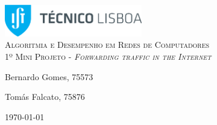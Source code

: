 \begin{titlepage}

	\begin{center}

		\includegraphics[width=6cm]{./title}\\[3cm]

		\textsc{\LARGE Algoritmia e Desempenho em Redes de Computadores}\\[1.5cm]

		\textsc{\Large 1º Mini Projeto - \textit{Forwarding traffic in the Internet}}\\[1.5cm]


		


		\noindent
		\begin{minipage}{0.4\textwidth}
			\begin{flushleft} \large
				Bernardo Gomes, 75573
			\end{flushleft}
		\end{minipage}
		\begin{minipage}{0.4\textwidth}
			\begin{flushright} \large
				Tomás Falcato, 75876
			\end{flushright}
		\end{minipage}

		\vfill

		{\large \today}


	\end{center}

\end{titlepage}